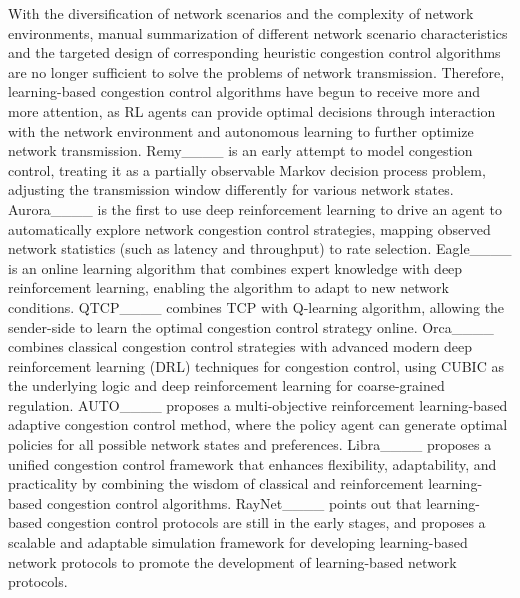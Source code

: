 With the diversification of network scenarios and the complexity of network environments, manual summarization of different network scenario characteristics and the targeted design of corresponding heuristic congestion control algorithms are no longer sufficient to solve the problems of network transmission. Therefore, learning-based congestion control algorithms have begun to receive more and more attention, as RL agents can provide optimal decisions through interaction with the network environment and autonomous learning to further optimize network transmission. Remy____ is an early attempt to model congestion control, treating it as a partially observable Markov decision process problem, adjusting the transmission window differently for various network states. Aurora____ is the first to use deep reinforcement learning to drive an agent to automatically explore network congestion control strategies, mapping observed network statistics (such as latency and throughput) to rate selection. Eagle____ is an online learning algorithm that combines expert knowledge with deep reinforcement learning, enabling the algorithm to adapt to new network conditions. QTCP____ combines TCP with Q-learning algorithm, allowing the sender-side to learn the optimal congestion control strategy online. Orca____ combines classical congestion control strategies with advanced modern deep reinforcement learning (DRL) techniques for congestion control, using CUBIC as the underlying logic and deep reinforcement learning for coarse-grained regulation. AUTO____ proposes a multi-objective reinforcement learning-based adaptive congestion control method, where the policy agent can generate optimal policies for all possible network states and preferences. Libra____ proposes a unified congestion control framework that enhances flexibility, adaptability, and practicality by combining the wisdom of classical and reinforcement learning-based congestion control algorithms. RayNet____ points out that learning-based congestion control protocols are still in the early stages, and proposes a scalable and adaptable simulation framework for developing learning-based network protocols to promote the development of learning-based network protocols. 

